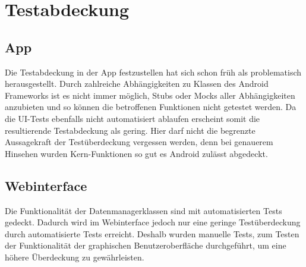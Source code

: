 \chapter{Testabdeckung}
\section{App}
Die Testabdeckung in der App festzustellen hat sich schon früh als problematisch herausgestellt. Durch zahlreiche Abhängigkeiten zu Klassen des Android Frameworks ist es nicht immer möglich, Stubs oder Mocks aller Abhängigkeiten anzubieten und so können die betroffenen Funktionen nicht getestet werden. Da die UI-Tests ebenfalls nicht automatisiert ablaufen erscheint somit die resultierende Testabdeckung als gering. Hier darf nicht die begrenzte Aussagekraft der Testüberdeckung vergessen werden, denn bei genauerem Hinsehen wurden Kern-Funktionen so gut es Android zulässt abgedeckt.

\section{Webinterface}
Die Funktionalität der Datenmanagerklassen sind mit automatisierten Tests gedeckt. Dadurch wird im Webinterface jedoch nur eine geringe Testüberdeckung durch automatisierte Tests erreicht. Deshalb wurden manuelle Tests, zum Testen der Funktionalität der graphischen Benutzeroberfläche durchgeführt, um eine höhere Überdeckung zu gewährleisten.